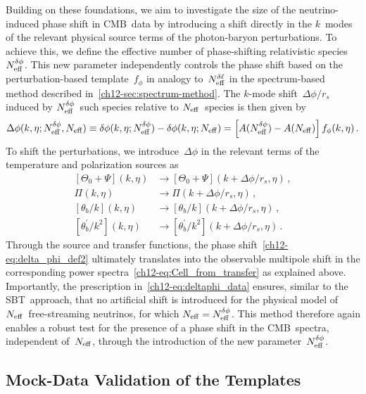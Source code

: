 Building on these foundations, we aim to investigate the size of the neutrino-induced phase shift in CMB~data by introducing a shift directly in the $k$~modes of the relevant physical source terms of the photon-baryon perturbations. To achieve this, we define the effective number of phase-shifting relativistic species~$N_\mathrm{eff}^{\delta\phi}$. This new parameter independently controls the phase shift based on the perturbation-based template~$f_\phi$ in analogy to~$N_\mathrm{eff}^{\delta\ell}$ in the spectrum-based method described in~\textsection\ref{ch12-sec:spectrum-method}. The $k$-mode shift~$\Delta\phi/r_s$ induced by $N_\mathrm{eff}^{\delta\phi}$~such species relative to $N_\mathrm{eff}$~species is then given by
\begin{equation}
	\Delta\phi(k, \eta; N_\mathrm{eff}^{\delta\phi}, N_\mathrm{eff}) \equiv \delta\phi(k, \eta; N_\mathrm{eff}^{\delta\phi}) - \delta\phi(k, \eta; N_\mathrm{eff}) = \left[A(N_\mathrm{eff}^{\delta\phi}) - A(N_\mathrm{eff})\right] f_\phi(k, \eta)\, . \label{ch12-eq:delta_phi_def2}
\end{equation}
To shift the perturbations, we introduce~$\Delta\phi$ in the relevant terms of the temperature and polarization sources as
\begin{equation}
	\begin{split}
		\left[\Theta_0 + \Psi\right]\!(k, \eta) 	&\rightarrow \left[\Theta_0 + \Psi\right]\!(k + \Delta\phi/r_s, \eta)\, ,	\\
		\Pi(k, \eta) 								&\rightarrow \Pi(k + \Delta\phi/r_s, \eta)\, ,								\\
		\left[\theta_b/k\right]\!(k, \eta) 			&\rightarrow \left[\theta_b/k\right]\!(k + \Delta\phi/r_s, \eta)\, ,		\\
		\left[\theta^\prime_b/k^2\right]\!(k, \eta) &\rightarrow \left[\theta^\prime_b/k^2\right]\!(k + \Delta\phi/r_s,\eta)\, .	
	\end{split}	\label{ch12-eq:deltaphi_data}
\end{equation}
Through the source and transfer functions, the phase shift~\eqref{ch12-eq:delta_phi_def2} ultimately translates into the observable multipole shift in the corresponding power spectra~\eqref{ch12-eq:Cell_from_transfer} as explained above. Importantly, the prescription in~\eqref{ch12-eq:deltaphi_data} ensures, similar to the SBT~approach, that no artificial shift is introduced for the physical model of~$N_\mathrm{eff}$~free-streaming neutrinos, for which $N_\mathrm{eff} = N_\mathrm{eff}^{\delta\phi}$. This method therefore again enables a robust test for the presence of a phase shift in the CMB~spectra, independent of~$N_\mathrm{eff}$, through the introduction of the new parameter~$N_\mathrm{eff}^{\delta\phi}$.


\subsection{Mock-Data Validation of the Templates}
\label{ch12-sec:validation_comparison}

